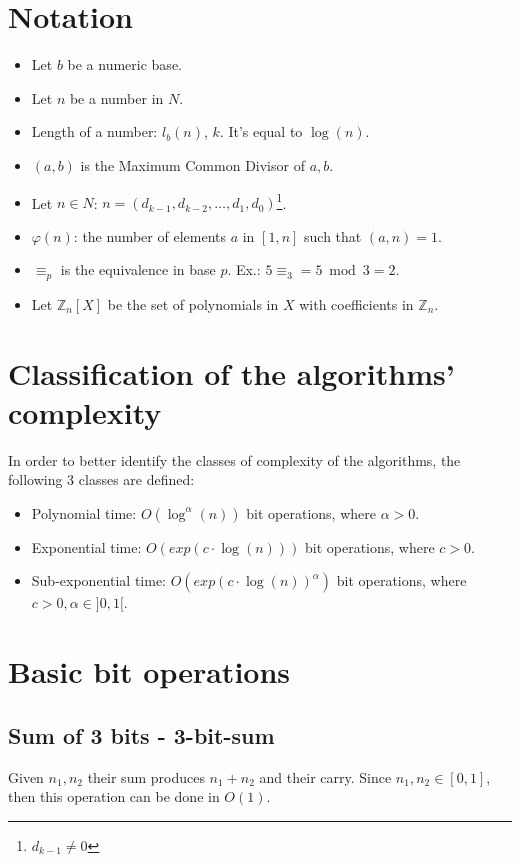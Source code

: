\section{Notation}
\begin{itemize}
    \item Let $b$ be a numeric base.
    \item Let $n$ be a number in $N$.
    \item Length of a number: $l_{b}(n)$, $k$. It's equal to $\operatorname{log}(n)$.
    \item $(a,b)$ is the Maximum Common Divisor of $a,b$.
    \item Let $n \in N$: $n = (d_{k-1}, d_{k-2}, \dots, d_{1}, d_{0})$\footnote{$d_{k-1} \neq 0$}.
    \item $\varphi(n)$: the number of elements $a$ in $[1,n]$ such that $(a,n) = 1$.
    \item $\equiv_{p}$ is the equivalence in base $p$. Ex.: $5 \equiv_{3} = 5 \bmod 3 = 2 $.
    \item Let $\mathbb{Z}_{n}[X]$ be the set of polynomials in $X$ with coefficients in $\mathbb{Z}_{n}$.
\end{itemize}


\section{Classification of the algorithms' complexity}
In order to better identify the classes of complexity of the algorithms, the following 3 classes are defined:
\begin{itemize}
    \item Polynomial time: $O(\operatorname{log}^{\alpha}(n))$ bit operations, where $\alpha > 0$.
    \item Exponential time: $O(exp(c \cdot \operatorname{log}(n)))$ bit operations, where $c > 0$.
    \item Sub-exponential time: $O(exp(c \cdot \operatorname{log}(n))^{\alpha})$ bit operations, where $c > 0, \alpha \in ]0, 1[$.
\end{itemize}



\section{Basic bit operations}
\subsection{Sum of 3 bits - 3-bit-sum}
Given $n_{1}, n_{2}$ their sum produces $n_{1} + n_{2}$ and their carry. \newline
Since $n_{1}, n_{2} \in [0,1]$, then this operation can be done in $O(1)$.

